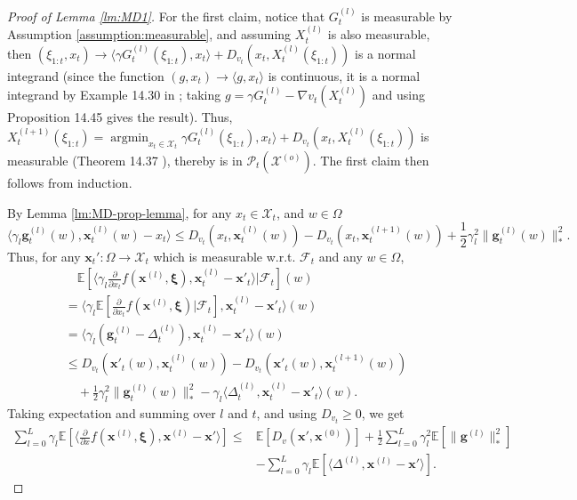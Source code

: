 \documentclass[11pt,fullpage,letterpaper]{article}
\newcommand{\mc}{\mathcal}
\newcommand{\mb}{\mathbf}
\newcommand{\E}{\mathbb{E}}
\newcommand{\bx}{\boldsymbol{\xi}}
\DeclareMathOperator*{\argmin}{argmin}
\begin{document}
\begin{proof}[Proof of Lemma \ref{lm:MD1}] For the first claim, notice that $G_t^{(l)}$ is measurable by Assumption \ref{assumption:measurable}, and assuming $X_t^{(l)}$ is also measurable, then $(\xi_{1:t},x_t) \to \langle \gamma G_t^{(l)}(\xi_{1:t}),x_t\rangle + D_{v_t}(x_t,X_t^{(l)}(\xi_{1:t}))$ is a normal integrand (since the function $(g,x_t)\to \langle g,x_t\rangle$ is continuous, it is a normal integrand by Example 14.30 in \cite{rockafellarVariational}; taking $g = \gamma G_t^{(l)} -\nabla v_t(X_t^{(l)})$ and using Proposition 14.45 \cite{rockafellarVariational} gives the result). Thus, $X_t^{(l+1)}(\xi_{1:t}) = \argmin_{x_t\in \mc X_t} \gamma G_t^{(l)}(\xi_{1:t}),x_t\rangle + D_{v_t}(x_t,X_t^{(l)}(\xi_{1:t}))$ is measurable (Theorem 14.37 \cite{rockafellarVariational}), thereby is in $\mc P_t(\mc X^{(o)})$. The first claim then follows from induction. 

By Lemma \ref{lm:MD-prop-lemma}, for any $x_t\in \mc X_t$, and $w\in \Omega$
\begin{displaymath}
    \langle \gamma_l \mb g^{(l)}_t(w),\mb x^{(l)}_t(w) - x_t\rangle\leq D_{v_t}(x_t,\mb x^{(l)}_t(w)) - D_{v_t}(x_t,\mb x^{(l+1)}_t(w)) + \frac{1}{2}\gamma_l^2 \|\mb g^{(l)}_t(w)\|_*^2.
\end{displaymath}
Thus, for any $\mb x_t':\Omega\to \mc X_t$ which is measurable w.r.t. $\mc F_t$ and any $w\in \Omega$,
\begin{align*}
    &\quad \E[\langle \gamma_l \frac{\partial}{\partial x_t}f(\mb x^{(l)},\bx),\mb x_t^{(l)}- \mb x'_t \rangle|\mc F_t](w)\\
    &=\langle \gamma_l \E[\frac{\partial}{\partial x_t}f(\mb x^{(l)},\bx)|\mc F_t],\mb x_t^{(l)}- \mb x'_t \rangle(w)\\
    &=\langle \gamma_l (\mb g_t^{(l)} -\Delta_t^{(l)}),\mb x_t^{(l)}- \mb x'_t \rangle(w)\\
    &\leq D_{v_t}(\mb x'_t(w),\mb x^{(l)}_t(w)) - D_{v_t}(\mb x'_t(w),\mb x^{(l+1)}_t(w)) \\
    &\quad + \frac{1}{2}\gamma_l^2 \|\mb g^{(l)}_t(w)\|_*^2-\gamma_l  \langle \Delta_t^{(l)},\mb x^{(l)}_t - \mb x'_t\rangle(w).
\end{align*}
Taking expectation and summing over $l$ and $t$, and using $D_{v_t}\geq 0$, we get 
\begin{align}\label{eq:md-cum}
     \sum_{l=0}^L \gamma_l \E[\langle \frac{\partial}{\partial x}f(\mb x^{(l)},\bx),\mb x^{(l)}- \mb x'\rangle]\leq &\E[D_{v}(\mb x',\mb x^{(0)})]+  \frac{1}{2}\sum_{l=0}^L\gamma_l^2 \E[\|\mb g^{(l)}\|_*^2]\\
     &-\sum_{l=0}^L\gamma_l \E[ \langle \Delta^{(l)},\mb x^{(l)} - \mb x'\rangle].\nonumber
\end{align}


\end{proof}
\end{document}
